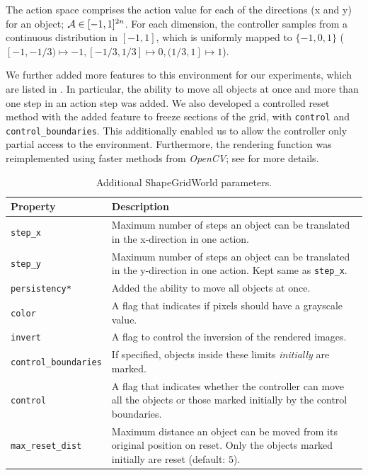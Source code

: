 The action space comprises the action value for each of the directions (x and y) for an object; \(\mathcal{A} \in [-1, 1]^{2 n}\).
For each dimension, the controller samples from a continuous distribution in \([-1, 1]\), which is uniformly mapped to \(\{-1, 0, 1\}\) (\([-1, -1/3) \mapsto -1, [-1/3, 1/3] \mapsto 0, (1/3, 1] \mapsto 1\)).

We further added more features to this environment for our experiments, which are listed in .
In particular, the ability to move all objects at once and more than one step in an action step was added.
We also developed a controlled reset method with the added feature to freeze sections of the grid, with \texttt{control} and \texttt{control\_boundaries}.
This additionally enabled us to allow the controller only partial access to the environment.
Furthermore, the rendering function was reimplemented using faster methods from \emph{OpenCV}; see  for more details.

\begin{table}[h]
    \centering
    \begin{tabularx}{\textwidth}{C{3.9cm} L}
        \hline
        Property & Description\\
        \hline
        \texttt{step\_x} & Maximum number of steps an object can be translated in the x-direction in one action.\\
        \texttt{step\_y} & Maximum number of steps an object can be translated in the y-direction in one action. Kept same as \texttt{step\_x}.\\
        \texttt{persistency*} & Added the ability to move all objects at once.\\
        \texttt{color} & A flag that indicates if pixels should have a grayscale value. \\
        \texttt{invert} & A flag to control the inversion of the rendered images. \\
        \texttt{control\_boundaries} & If specified, objects inside these limits \emph{initially} are marked.\\
        \texttt{control} & A flag that indicates whether the controller can move all the objects or those marked initially by the control boundaries.\\
        \texttt{max\_reset\_dist} & Maximum distance an object can be moved from its original position on reset. Only the objects marked initially are reset (default: \(5\)).\\
        \hline
    \end{tabularx}
    \caption{Additional ShapeGridWorld parameters.}
    \label{tab:additional-sgw-params}
\end{table}

